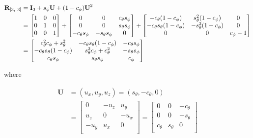 \begin{align*}
    \textbf{R}_{[3,~3]} 
    &= \textbf{I}_3 + s_\phi\*\textbf{U} + (1-c_\phi)\*\textbf{U}^2 \\
        &=
    \begin{bmatrix}
      1 & 0 & 0 \\ 
      0 & 1 & 0 \\ 
      0 & 0 & 1 \\
    \end{bmatrix} +
    \begin{bmatrix}
      0 & 0 & c_\theta s_\phi \\
      0 & 0 & s_\theta s_\phi \\
      -c_\theta s_\phi & -s_\theta s_\phi & 0 \\
    \end{bmatrix} +
    \begin{bmatrix}
      -c_\theta (1-c_\phi) & s^2_\theta (1-c_\phi) & 0 \\
      -c_\theta s_\theta (1-c_\phi) & -s^2_\theta (1-c_\phi) & 0 \\
      0 & 0 & c_\phi-1 \\
    \end{bmatrix} \\
    &= 
    \begin{bmatrix}
      c_\theta^2 c_\phi + s_\theta^2 &
      -c_\theta s_\theta (1 - c_\phi) &
      -c_\theta s_\phi \\
      -c_\theta s_\theta (1 - c_\phi) &
      s_\theta^2 c_\phi + c_\theta^2 &
      -s_\theta s_\phi \\
      c_\theta s_\phi &
      s_\theta s_\phi &
      c_\phi
    \end{bmatrix} \\
\end{align*}

\noindent where

\begin{align*}
  \textbf{U} &= (u_x, u_y, u_z) =
  (s_\theta, -c_\theta, 0) \\ 
  &=
  \begin{bmatrix}
  0 & -u_z & u_y  \\
  u_z & 0 & -u_x \\
  -u_y & u_x & 0 \\
  \end{bmatrix} =
  \begin{bmatrix}
    0 & 0 & -c_\theta \\
    0 & 0 & -s_\theta \\
    c_\theta & s_\theta & 0 \\
  \end{bmatrix} \\
  \end{align*}

